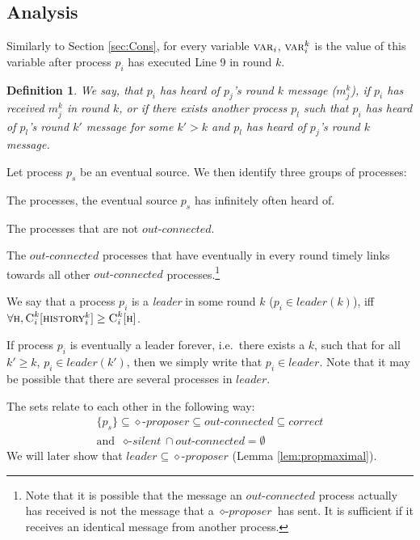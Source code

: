 \documentclass[conference, compsoc]{IEEEtran}
\newtheorem{definition}{Definition}
\def\history{\textsc{history}}
\def\C{\textsc{C}}
\def\proposer{\diamond\textit{-proposer}}
\def\out{\textit{out-connected}}
\def\leader{\textit{leader}}
\def\m{m}
\def\h{\textsc{h}}
\begin{document}
\subsection{Analysis}
Similarly to Section \ref{sec:Cons}, for every variable $\textsc{var}_i$, $\textsc{var}_i^k$ is the value of this variable after process $p_i$ has executed Line 9 in round $k$. 
\begin{definition}
 We say, that $p_i$ \emph{has heard of} $p_j$'s round $k$ message ($\m_{j}^k$), if $p_i$ has received $\m_{j}^k$ in round $k$, or if there exists another process $p_l$ such that $p_i$ has heard of $p_l$'s round $k'$ message for some $k' > k$ and $p_l$ has heard of $p_j$'s round $k$ message.  
\end{definition}
Let process $p_s$ be an eventual source. We then identify three groups of processes:
\begin{description}[\IEEEsetlabelwidth{$\out$:}] 
 \item[$\out$:] The processes, the eventual source $p_s$ has infinitely often heard of.
 \item[\textit{$\diamond$-silent}:] The processes that are not $\out$.
 \item[$\proposer$:] The $\out$ processes that have eventually in every round timely links towards all other $\out$ processes.\footnote{Note that it is possible that the message an $\out$ process actually has received is not the message that a $\proposer$ has sent. It is sufficient if it receives an identical message from another process.}
 \item[$\leader$:] We say that a process $p_i$ is a \emph{leader} in some round $k$ ($p_i \in \leader(k)$), iff $ \forall \h, \C_{i}^k [\history_{i}^k] \ge \C_{i}^k[\h] $. 

 If process $p_i$ is eventually a leader forever, i.e.~there exists a $k$, such that for all $k' \ge k$, $p_i \in \leader(k')$, then we simply write that $p_i \in leader$. Note that it may be possible that there are several processes in $\leader$.
\end{description}
The sets relate to each other in the following way:
\begin{eqnarray*}
 & \{ p_s \} \subseteq \proposer \subseteq \out \subseteq \textit{correct} & \\
 & \textrm{and } \ \textit{$\diamond$-silent} \cap \out = \emptyset &
\end{eqnarray*}
We will later show that $\leader \subseteq \proposer$ (Lemma \ref{lem:propmaximal}).
\end{document}
